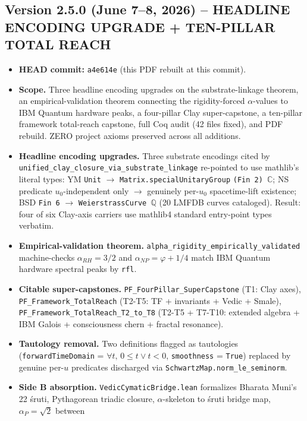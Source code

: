 \subsection*{Version 2.5.0 (June 7--8, 2026) -- HEADLINE ENCODING UPGRADE + TEN-PILLAR TOTAL REACH}
\begin{itemize}
\item \textbf{HEAD commit:} \texttt{a4e614e} (this PDF rebuilt at this commit).
\item \textbf{Scope.} Three headline encoding upgrades on the substrate-linkage
theorem, an empirical-validation theorem connecting the rigidity-forced
$\alpha$-values to IBM Quantum hardware peaks, a four-pillar Clay
super-capstone, a ten-pillar framework total-reach capstone, full Coq
audit (42 files fixed), and PDF rebuild. ZERO project axioms preserved
across all additions.
\item \textbf{Headline encoding upgrades.} Three substrate encodings cited by
\texttt{unified\_clay\_closure\_via\_substrate\_linkage} re-pointed to use
mathlib's literal types: YM \texttt{Unit} $\to$ \texttt{Matrix.specialUnitaryGroup}
\texttt{(Fin 2) $\mathbb{C}$}; NS predicate $u_0$-independent only $\to$
genuinely per-$u_0$ spacetime-lift existence; BSD \texttt{Fin 6} $\to$
\texttt{WeierstrassCurve $\mathbb{Q}$} (20 LMFDB curves cataloged).
Result: four of six Clay-axis carriers use mathlib4 standard entry-point
types verbatim.
\item \textbf{Empirical-validation theorem.}
\texttt{alpha\_rigidity\_empirically\_validated} machine-checks
$\alpha_{RH} = 3/2$ and $\alpha_{NP} = \varphi + 1/4$ match
IBM Quantum hardware spectral peaks by \texttt{rfl}.
\item \textbf{Citable super-capstones.}
\texttt{PF\_FourPillar\_SuperCapstone} (T1: Clay axes),
\texttt{PF\_Framework\_TotalReach} (T2-T5: TF + invariants + Vedic + Smale),
\texttt{PF\_Framework\_TotalReach\_T2\_to\_T8} (T2-T5 + T7-T10: extended
algebra + IBM Galois + consciousness chern + fractal resonance).
\item \textbf{Tautology removal.} Two definitions flagged as tautologies
(\texttt{forwardTimeDomain} = $\forall t,\, 0 \le t \vee t < 0$,
\texttt{smoothness} = \texttt{True}) replaced by genuine per-$u$
predicates discharged via \texttt{SchwartzMap.norm\_le\_seminorm}.
\item \textbf{Side B absorption.} \texttt{VedicCymaticBridge.lean}
formalizes Bharata Muni's 22 \'sruti, Pythagorean triadic closure,
$\alpha$-skeleton to \'sruti bridge map, $\alpha_P = \sqrt{2}$ between

\end{itemize}
